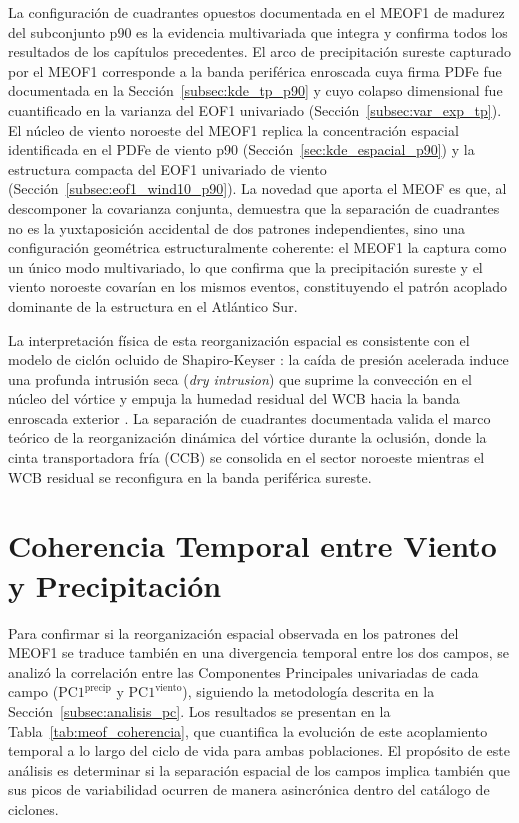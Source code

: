La configuración de cuadrantes opuestos documentada en el MEOF1 de madurez del subconjunto p90 es la evidencia multivariada que integra y confirma todos los resultados de los capítulos precedentes. 
El arco de precipitación sureste capturado por el MEOF1 corresponde a la banda periférica enroscada cuya firma PDFe fue documentada en la Sección~\ref{subsec:kde_tp_p90} y cuyo colapso dimensional fue cuantificado en la varianza del EOF1 univariado (Sección~\ref{subsec:var_exp_tp}).
El núcleo de viento noroeste del MEOF1 replica la concentración espacial identificada en el PDFe de viento p90 (Sección~\ref{sec:kde_espacial_p90}) y la estructura compacta del EOF1 univariado de viento (Sección~\ref{subsec:eof1_wind10_p90}). La novedad que aporta el MEOF es que, al descomponer la covarianza conjunta, demuestra que la separación de cuadrantes no es la yuxtaposición accidental de dos patrones independientes, sino una configuración geométrica estructuralmente coherente: el MEOF1 la captura como un único modo multivariado, lo que confirma que la precipitación sureste y el viento noroeste covarían en los mismos eventos, constituyendo el patrón acoplado dominante de la estructura en el Atlántico Sur.

La interpretación física de esta reorganización espacial es consistente con el modelo de ciclón ocluido de Shapiro-Keyser \citep{schultz2021antecedents}: la caída de presión acelerada induce una profunda intrusión seca (\textit{dry intrusion}) que suprime la convección en el núcleo del vórtice y empuja la humedad residual del WCB hacia la banda enroscada exterior \citep{shapiro1999bridge}. La separación de cuadrantes documentada valida el marco teórico de la reorganización dinámica del vórtice durante la oclusión, donde la cinta transportadora fría (CCB) se consolida en el sector noroeste mientras el WCB residual se reconfigura en la banda periférica sureste.

\section{Coherencia Temporal entre Viento y Precipitación}
\label{sec:meof_coherencia}

Para confirmar si la reorganización espacial observada en los patrones del MEOF1 se traduce también en una divergencia temporal entre los dos campos, se analizó la correlación entre las Componentes Principales univariadas de cada campo ($\text{PC1}^{\text{precip}}$ y $\text{PC1}^{\text{viento}}$), siguiendo la metodología descrita en la Sección~\ref{subsec:analisis_pc}. Los resultados se presentan en la Tabla~\ref{tab:meof_coherencia}, que cuantifica la evolución de este acoplamiento temporal a lo largo del ciclo de vida para ambas poblaciones. El propósito de este análisis es determinar si la separación espacial de los campos implica también que sus picos de variabilidad ocurren de manera asincrónica dentro del catálogo de ciclones.

